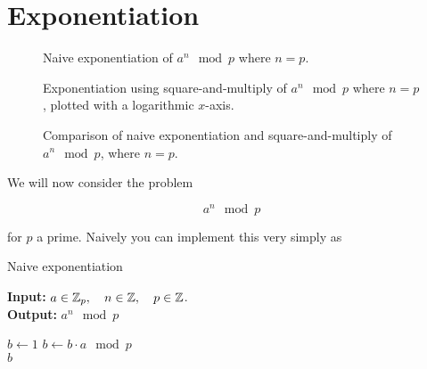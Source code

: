 \section{Exponentiation}

\begin{figure}
  \begin{center}
    
  \end{center}
  \caption{Naive exponentiation of $a^n \mod{p}$ where $n=p$.}\label{fig:naive-plot}
\end{figure}

\begin{figure}
  \begin{center}
    
  \end{center}
  \caption{Exponentiation using square-and-multiply of $a^n \mod{p}$ where $n=p$, plotted with a logarithmic $x$-axis.}\label{fig:square}
\end{figure}

\begin{figure}
  \begin{center}
    
  \end{center}
  \caption{Comparison of naive exponentiation and square-and-multiply of $a^n \mod{p}$, where $n=p$.}\label{fig:square-naive}
\end{figure}


We will now consider the problem 

\begin{equation}
  a^n \mod{p}
  \label{eq:exp}
\end{equation}

for $p$ a prime. Naively you can implement this very simply as

\begin{algorithm}
  \caption{Naive exponentiation}
  \label{alg:naive_exp}
  \textbf{Input:} $a \in \mathbb{Z}_p, \quad n \in \mathbb{Z}, \quad p \in \mathbb{Z}$. \\
  \textbf{Output:} $a^n \mod{p}$
  \begin{algorithmic}[1]
    \State $b \gets 1$
      \State $b \gets b \cdot a \mod{p}$
    \EndFor \\
    \Return $b$
  \end{algorithmic}
\end{algorithm}

